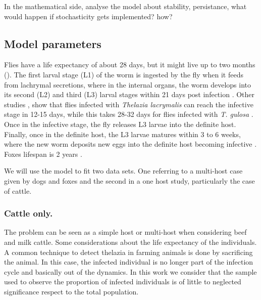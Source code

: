 \documentclass[preprint,12pt]{elsarticle}
\begin{document}
\noindent In the mathematical side, analyse the model about stability, persistance, what would happen if stochasticity gets implemented? how?

\subsection{Model parameters}
\noindent Flies have a life expectancy of about 28 days, but it might live up to two months (\cite{sanchez:1998}). The first larval stage (L1) of the worm is ingested by the fly when it feeds from lachrymal secretions, where in the internal organs, the worm develops into its second (L2) and third (L3) larval stages within 21 days post infection \cite{Otranto:2003}. Other studies
\cite{Chanie:2014}, show that flies infected with \textit{Thelazia lacrymalis} can reach the infective stage in 12-15 days, while this takes 28-32 days for flies infected with \textit{T. gulosa} \cite{Chanie:2014}. Once in the infective stage, the fly releases L3 larvae into the definite host. Finally, once in the definite host, the L3 larvae matures within 3 to 6 weeks, where the new worm deposits new eggs into the definite host becoming infective \cite{Chanie:2014}. Foxes lifespan is 2 years \cite{Devenish:2014}.

\noindent We will use the model to fit two data sets. One referring to a multi-host case given by dogs and foxes and the second in a one host study, particularly the case of cattle.

\subsubsection{Cattle only.}
\noindent The problem can be seen as a simple host or multi-host when considering beef and milk cattle.
\noindent Some considerations about the life expectancy of the individuals. A common technique 
to detect thelazia in farming animals is done by sacrificing the animal. In this case, the infected individual is no longer part of the infection cycle and basically out of the dynamics.
In this work we consider that the sample used to observe the proportion of infected individuals is of little to neglected significance respect to the total population.
\end{document}
